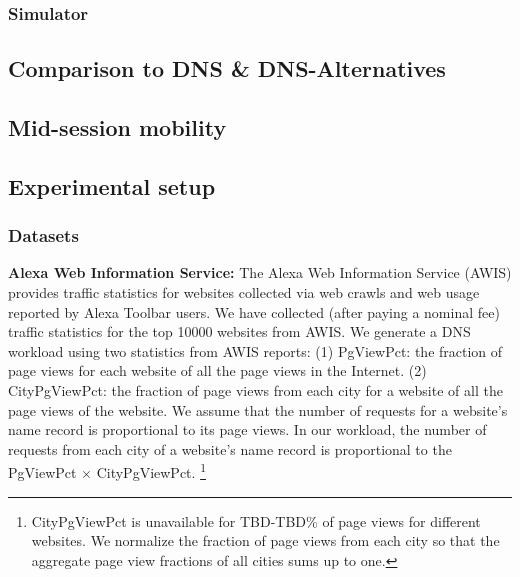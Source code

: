 \subsubsection{Simulator}


\subsection{Comparison to DNS \& DNS-Alternatives}


\subsection{Mid-session mobility}


\subsection{}

\subsection{Experimental setup}

\subsubsection{Datasets}
\label{sec:datasets}

{\bf Alexa Web Information Service:}
The Alexa Web Information Service \cite{alexa} (AWIS) provides traffic statistics for websites collected via web crawls and web usage reported by Alexa Toolbar users.
We have collected (after paying a nominal fee) traffic statistics for the top 10000 websites from AWIS. We generate a DNS workload using 
 two statistics from AWIS reports:
(1) PgViewPct: the fraction of page views for each website of all the page views in the Internet.
(2) CityPgViewPct: the fraction of page views from each city for a website of all the page views of the website.
We  assume that the number of requests for a website's name record is proportional to its page views.
In our workload, the number of requests from each city of a website's name record is proportional to the PgViewPct $\times$ CityPgViewPct.
\footnote{CityPgViewPct is unavailable for TBD-TBD\% of page views for different websites.
We normalize the fraction of page views from each city so that the aggregate page view fractions of all cities sums up to one.} 

